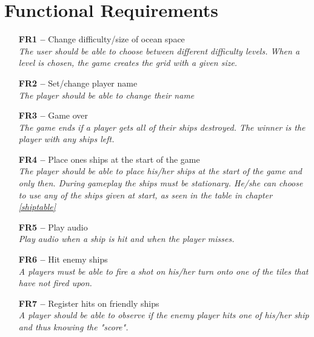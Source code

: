 \chapter{Functional Requirements}

\begin{itemize}
    \item[\textbf{FR1 --}] Change difficulty/size of ocean space \\
    \textit{\small{The user should be able to choose between different difficulty levels. When a level is chosen, the game creates the grid with a given size.}}
    \item[\textbf{FR2 --}] Set/change player name \\
    \textit{\small{The player should be able to change their name}}
    \item[\textbf{FR3 --}] Game over \\
    \textit{\small{The game ends if a player gets all of their ships destroyed. The winner is the player with any ships left.}}
    \item[\textbf{FR4 --}] Place ones ships at the start of the game \\
    \textit{\small{The player should be able to place his/her ships at the start of the game and only then. During gameplay the ships must be stationary. He/she can choose to use any of the ships given at start, as seen in the table in chapter \ref{shiptable}}}
    \item[\textbf{FR5 --}] Play audio \\
    \textit{\small{Play audio when a ship is hit and when the player misses.}}
    \item[\textbf{FR6 --}] Hit enemy ships \\
    \textit{\small{A players must be able to fire a shot on his/her turn onto one of the tiles that have not fired upon.}}
    \item[\textbf{FR7 --}] Register hits on friendly ships \\
    \textit{\small{A player should be able to observe if the enemy player hits one of his/her ship and thus knowing the "score".}}
\end{itemize}